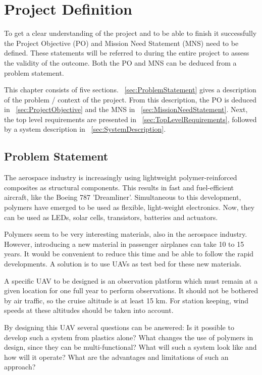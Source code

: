 \documentclass[a4paper]{report}
\begin{document}
\chapter{Project Definition}
To get a clear understanding of the project and to be able to finish it successfully the Project Objective (PO) and Mission Need Statement (MNS) need to be defined. These statements will be referred to during the entire project to assess the validity of the outcome. Both the PO and MNS can be deduced from a problem statement.

This chapter consists of five sections. ~\autoref{sec:ProblemStatement} gives a description of the problem / context of the project. From this description, the PO is deduced in ~\autoref{sec:ProjectObjective} and the MNS in ~\autoref{sec:MissionNeedStatement}. Next, the top level requirements are presented in ~\autoref{sec:TopLevelRequirements}, followed by a system description in ~\autoref{sec:SystemDescription}.

\section{Problem Statement}
\label{sec:ProblemStatement}
The aerospace industry is increasingly using lightweight polymer-reinforced composites as structural components. This results in fast and fuel-efficient aircraft, like the Boeing 787 'Dreamliner'. Simultaneous to this development, polymers have emerged to be used as flexible, light-weight electronics. Now, they can be used as LEDs, solar cells, transistors, batteries and actuators.

Polymers seem to be very interesting materials, also in the aerospace industry. However, introducing a new material in passenger airplanes can take 10 to 15 years. It would be convenient to reduce this time and be able to follow the rapid developments. A solution is to use UAVs as test bed for these new materials.

A specific UAV to be designed is an observation platform which must remain at a given location for one full year to perform observations. It should not be bothered by air traffic, so the cruise altitude is at least 15 km. For station keeping, wind speeds at these altitudes should be taken into account.

By designing this UAV several questions can be answered: Is it possible to develop such a system from plastics alone? What changes the use of polymers in design, since they can be multi-functional? What will such a system look like and how will it operate? What are the advantages and limitations of such an approach?
\end{document}
